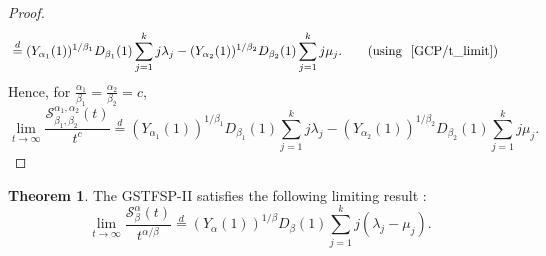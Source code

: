 \documentclass[11pt,oneside,reqno]{amsart}
\theoremstyle{definition}
\newtheorem{theorem}{\bf Theorem}[section]
\theoremstyle{remarkstyle}
\begin{document}
\begin{proof}
\begin{align}
    &\overset{d}{=}(Y_{\alpha_1}(1))^{1/\beta_1}D_{\beta_1}(1)\sum_{j=1}^{k}j\lambda_j-(Y_{\alpha_2}(1))^{1/\beta_2}D_{\beta_2}(1)\sum_{j=1}^{k}j\mu_j. \qquad(\text{using~ \eqref{GCP/t_limit}}) \nonumber
\end{align}
Hence, for $\frac{\alpha_1}{\beta_1}=\frac{\alpha_2}{\beta_2}=c$,
\begin{equation*}
\lim_{t\rightarrow\infty}\frac{\mathcal{S}_{\beta_1,\beta_2}^{\alpha_1,\alpha_2}(t)}{t^{c}} \overset{d}{=}(Y_{\alpha_1}(1))^{1/\beta_1}D_{\beta_1}(1)\sum_{j=1}^{k}j\lambda_j-(Y_{\alpha_2}(1))^{1/\beta_2}D_{\beta_2}(1)\sum_{j=1}^{k}j\mu_j.
\end{equation*}
\end{proof}

\begin{theorem}\label{GSTFSP.limit}
The GSTFSP-II satisfies the following limiting result :
\begin{equation*}
\lim_{t\rightarrow\infty}\frac{\mathcal{S}_{\beta}^{\alpha}(t)}{t^{\alpha/\beta}} \overset{d}{=} (Y_\alpha(1))^{1/\beta}D_\beta(1)\sum_{j=1}^{k}j(\lambda_j-\mu_j).
\end{equation*}
\end{theorem}
\end{document}
